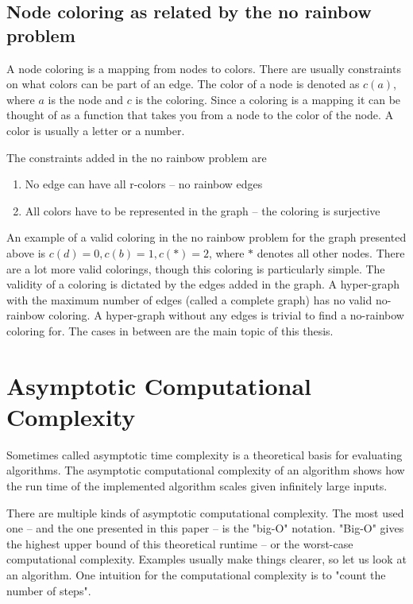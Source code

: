 \documentclass[msc,lith,english]{liuthesis}
\begin{document}
\subsection{Node coloring as related by the no rainbow problem}
A node coloring is a mapping from nodes to colors.
There are usually constraints on what colors can be part of an edge.
The color of a node is denoted as $c(a)$, where $a$ is the node and $c$ is the coloring.
Since a coloring is a mapping it can be thought of as a function that takes you from a node to the color of the node.
A color is usually a letter or a number.

The constraints added in the no rainbow problem are
\begin{enumerate}
  \item No edge can have all r-colors -- no rainbow edges
  \item All colors have to be represented in the graph -- the coloring is surjective
\end{enumerate}

An example of a valid coloring in the no rainbow problem for the graph presented above is $c(d)=0, c(b)=1, c(*)=2$, where $*$ denotes all other nodes.
There are a lot more valid colorings, though this coloring is particularly simple.
The validity of a coloring is dictated by the edges added in the graph.
A hyper-graph with the maximum number of edges (called a complete graph) has no valid no-rainbow coloring.
A hyper-graph without any edges is trivial to find a no-rainbow coloring for.
The cases in between are the main topic of this thesis.

\cite{sourceHyper}

\section{Asymptotic Computational Complexity}
Sometimes called asymptotic time complexity is a theoretical basis for evaluating algorithms.
The asymptotic computational complexity of an algorithm shows how the run time
of the implemented algorithm scales given infinitely large inputs.

There are multiple kinds of asymptotic computational complexity. The most used
one -- and the one presented in this paper -- is the "big-O" notation. "Big-O"
gives the highest upper bound of this theoretical runtime -- or the worst-case
computational complexity. Examples usually make things clearer, so let us look at an algorithm.
One intuition for the computational complexity is to "count the number of steps".
\end{document}
